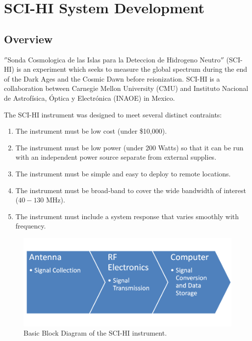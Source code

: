 \chapter{SCI-HI System Development}\label{Ch:System}



\section{Overview} \label{Sec:sysover}

$''$Sonda Cosmologica de las Islas para la Deteccion de Hidrogeno Neutro$''$ (SCI-HI) is an experiment which seeks to measure the \cm global spectrum during the end of the Dark Ages and the Cosmic Dawn before reionization. SCI-HI is a collaboration between Carnegie Mellon University (CMU) and Instituto Nacional de Astrof\'{i}sica, \'{O}ptica y Electr\'{o}nica (INAOE) in Mexico.  

The SCI-HI instrument was designed to meet several distinct contraints:

\begin{enumerate}
\item The instrument must be low cost (under \$10,000).

\item The instrument must be low power (under  200 Watts) so that it can be run with an independent power source separate from external supplies. 

\item The instrument must be simple and easy to deploy to remote locations. 

\item The instrument must be broad-band to cover the wide bandwidth of interest ($40-130$ MHz).

\item The instrument must include a system response that varies smoothly with frequency. 

\end{enumerate}

\begin{figure}[bht]
\begin{center}
\includegraphics[width=0.9\linewidth]{SCIHI_system/figures/basic_block_diagram.png}
\caption{Basic Block Diagram of the SCI-HI instrument.}
\label{Fig:basic_block_diagram}
\end{center}
\end{figure}

